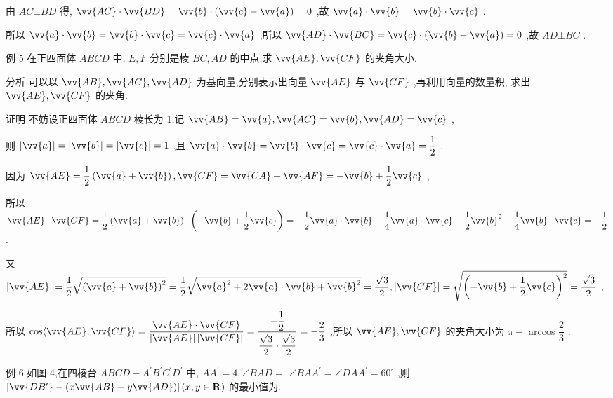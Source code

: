 由 ${AC} \bot  {BD}$ 得, $\vv{AC} \cdot  \vv{BD} = \vv{b} \cdot  \left( {\vv{c} - \vv{a}}\right)  = 0$ ,故 $\vv{a} \cdot  \vv{b} = \vv{b} \cdot  \vv{c}$ .

所以 $\vv{a} \cdot  \vv{b} = \vv{b} \cdot  \vv{c} = \vv{c} \cdot  \vv{a}$ ,所以 $\vv{AD} \cdot  \vv{BC} = \vv{c} \cdot  \left( {\vv{b} - \vv{a}}\right)  = 0$ ,故 ${AD} \bot  {BC}$ .

例 5 在正四面体 ${ABCD}$ 中, $E,F$ 分别是棱 ${BC},{AD}$ 的中点,求 $\vv{AE},\vv{CF}$ 的夹角大小.

分析 可以以 $\vv{AB},\vv{AC},\vv{AD}$ 为基向量,分别表示出向量 $\vv{AE}$ 与 $\vv{CF}$ ,再利用向量的数量积, 求出 $\vv{AE},\vv{CF}$ 的夹角.

证明 不妨设正四面体 ${ABCD}$ 棱长为 1,记 $\vv{AB} = \vv{a},\vv{AC} = \vv{b},\vv{AD} = \vv{c}$ ,

则 $\left| \vv{a}\right|  = \left| \vv{b}\right|  = \left| \vv{c}\right|  = 1$ ,且 $\vv{a} \cdot  \vv{b} = \vv{b} \cdot  \vv{c} = \vv{c} \cdot  \vv{a} = \dfrac{1}{2}$ .

因为 $\vv{AE} = \dfrac{1}{2}\left( {\vv{a} + \vv{b}}\right) ,\vv{CF} = \vv{CA} + \vv{AF} =  - \vv{b} + \dfrac{1}{2}\vv{c}$ ,

所以 $\vv{AE} \cdot  \vv{CF} = \dfrac{1}{2}\left( {\vv{a} + \vv{b}}\right)  \cdot  \left( {-\vv{b} + \dfrac{1}{2}\vv{c}}\right)  =  - \dfrac{1}{2}\vv{a} \cdot  \vv{b} + \dfrac{1}{4}\vv{a} \cdot  \vv{c} - \dfrac{1}{2}{\vv{b}}^{2} + \dfrac{1}{4}\vv{b} \cdot  \vv{c} =  - \dfrac{1}{2}$ .

又 $\left| \vv{AE}\right|  = \dfrac{1}{2}\sqrt{{\left( \vv{a} + \vv{b}\right) }^{2}} = \dfrac{1}{2}\sqrt{{\vv{a}}^{2} + 2\vv{a} \cdot  \vv{b} + {\vv{b}}^{2}} = \dfrac{\sqrt{3}}{2},\left| \vv{CF}\right|  = \sqrt{{\left( -\vv{b} + \dfrac{1}{2}\vv{c}\right) }^{2}} = \dfrac{\sqrt{3}}{2}$ ,

所以 $\cos \langle \vv{AE},\vv{CF}\rangle  = \dfrac{\vv{AE} \cdot  \vv{CF}}{\left| \vv{AE}\right| \left| \vv{CF}\right| } = \dfrac{-\dfrac{1}{2}}{\dfrac{\sqrt{3}}{2} \cdot  \dfrac{\sqrt{3}}{2}} =  - \dfrac{2}{3}$ ,所以 $\vv{AE},\vv{CF}$ 的夹角大小为 $\pi  -$ arccos $\dfrac{2}{3}$ .

例 6 如图 4,在四棱台 ${ABCD} - {A}^{\prime }{B}^{\prime }{C}^{\prime }{D}^{\prime }$ 中, $A{A}^{\prime } = 4,\angle {BAD} =$  $\angle {BA}{A}^{\prime } = \angle {DA}{A}^{\prime } = {60}^{ \circ  }$ ,则 $\left| {\vv{D{B}^{\prime }} - \left( {x\vv{AB} + y\vv{AD}}\right) }\right| \left( {x,y \in  \mathbf{R}}\right)$ 的最小值为\blkda{}.

